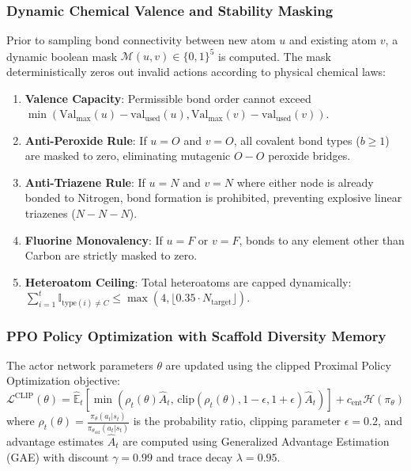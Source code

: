 \documentclass[10pt,a4paper]{article}
\begin{document}
\subsubsection*{Dynamic Chemical Valence and Stability Masking}
Prior to sampling bond connectivity between new atom $u$ and existing atom $v$, a dynamic boolean mask $\mathcal{M}(u, v) \in \{0, 1\}^5$ is computed. The mask deterministically zeros out invalid actions according to physical chemical laws:
\begin{enumerate}[noitemsep]
    \item \textbf{Valence Capacity}: Permissible bond order cannot exceed $\min(\text{Val}_{\max}(u) - \text{val}_{\text{used}}(u), \text{Val}_{\max}(v) - \text{val}_{\text{used}}(v))$.
    \item \textbf{Anti-Peroxide Rule}: If $u = O$ and $v = O$, all covalent bond types ($b \ge 1$) are masked to zero, eliminating mutagenic $O-O$ peroxide bridges.
    \item \textbf{Anti-Triazene Rule}: If $u = N$ and $v = N$ where either node is already bonded to Nitrogen, bond formation is prohibited, preventing explosive linear triazenes ($N-N-N$).
    \item \textbf{Fluorine Monovalency}: If $u = F$ or $v = F$, bonds to any element other than Carbon are strictly masked to zero.
    \item \textbf{Heteroatom Ceiling}: Total heteroatoms are capped dynamically: $\sum_{i=1}^t \mathbb{I}_{\text{type}(i) \ne C} \le \max(4, \lfloor 0.35 \cdot N_{\text{target}} \rfloor)$.
\end{enumerate}

\subsubsection*{PPO Policy Optimization with Scaffold Diversity Memory}
The actor network parameters $\theta$ are updated using the clipped Proximal Policy Optimization objective:
\begin{equation}
\mathcal{L}^{\text{CLIP}}(\theta) = \hat{\mathbb{E}}_t \left[ \min\left( \rho_t(\theta) \hat{A}_t, \, \text{clip}(\rho_t(\theta), 1-\epsilon, 1+\epsilon) \hat{A}_t \right) \right] + c_{\text{ent}} \mathcal{H}(\pi_\theta)
\end{equation}
where $\rho_t(\theta) = \frac{\pi_\theta(a_t | s_t)}{\pi_{\theta_{\text{old}}}(a_t | s_t)}$ is the probability ratio, clipping parameter $\epsilon = 0.2$, and advantage estimates $\hat{A}_t$ are computed using Generalized Advantage Estimation (GAE) with discount $\gamma = 0.99$ and trace decay $\lambda = 0.95$.
\end{document}
